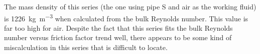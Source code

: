 The mass density of this series (the one using pipe S and air as the working
fluid) is \SI{1226}{\kg\m^{-3}} when calculated from the bulk Reynolds number.
This value is far too high for air.  Despite the fact that this series fits the
bulk Reynolds number versus friction factor trend well, there appears to be
some kind of miscalculation in this series that is difficult to locate.
